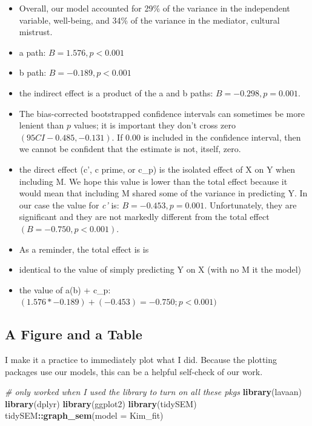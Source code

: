 \documentclass[
  11pt,
]{book}
\newenvironment{Shaded}{\begin{snugshade}}{\end{snugshade}}
\newcommand{\AttributeTok}[1]{\textcolor[rgb]{0.27,0.27,0.27}{#1}}
\newcommand{\CommentTok}[1]{\textcolor[rgb]{0.37,0.37,0.37}{\textit{#1}}}
\newcommand{\FunctionTok}[1]{\textcolor[rgb]{0.27,0.27,0.27}{\textbf{#1}}}
\newcommand{\NormalTok}[1]{#1}
\newcommand{\SpecialCharTok}[1]{\textcolor[rgb]{0.43,0.43,0.43}{\textbf{#1}}}
\providecommand{\tightlist}{%
  \setlength{\itemsep}{0pt}\setlength{\parskip}{0pt}}
\begin{document}
\begin{itemize}
\tightlist
\item
  Overall, our model accounted for 29\% of the variance in the independent variable, well-being, and 34\% of the variance in the mediator, cultural mistrust.
\item
  a path: \(B = 1.576, p < 0.001\)
\item
  b path: \(B = -0.189, p < 0.001\)
\item
  the indirect effect is a product of the a and b paths: \(B = -0.298, p = 0.001\).
\item
  The bias-corrected bootstrapped confidence intervals can sometimes be more lenient than \(p\) values; it is important they don't cross zero \((95CI -0.485, -0.131 )\). If 0.00 is included in the confidence interval, then we cannot be confident that the estimate is not, itself, zero.
\item
  the direct effect (c', c prime, or c\_p) is the isolated effect of X on Y when including M. We hope this value is lower than the total effect because it would mean that including M shared some of the variance in predicting Y. In our case the value for \emph{c'} is: \(B = -0.453, p = 0.001\). Unfortunately, they are significant and they are not markedly different from the total effect \((B = -0.750, p < 0.001)\).
\item
  As a reminder, the total effect is is
\item
  identical to the value of simply predicting Y on X (with no M it the model)
\item
  the value of a(b) + c\_p: \((1.576*-0.189) + (-0.453) = -0.750; p < 0.001)\)
\end{itemize}

\hypertarget{a-figure-and-a-table}{%
\subsection{A Figure and a Table}\label{a-figure-and-a-table}}

I make it a practice to immediately plot what I did. Because the plotting packages use our models, this can be a helpful self-check of our work.

\begin{Shaded}
\begin{Highlighting}[]
\CommentTok{\# only worked when I used the library to turn on all these pkgs}
\FunctionTok{library}\NormalTok{(lavaan)}
\FunctionTok{library}\NormalTok{(dplyr)}
\FunctionTok{library}\NormalTok{(ggplot2)}
\FunctionTok{library}\NormalTok{(tidySEM)}
\NormalTok{tidySEM}\SpecialCharTok{::}\FunctionTok{graph\_sem}\NormalTok{(}\AttributeTok{model =}\NormalTok{ Kim\_fit)}
\end{Highlighting}
\end{Shaded}
\end{document}
